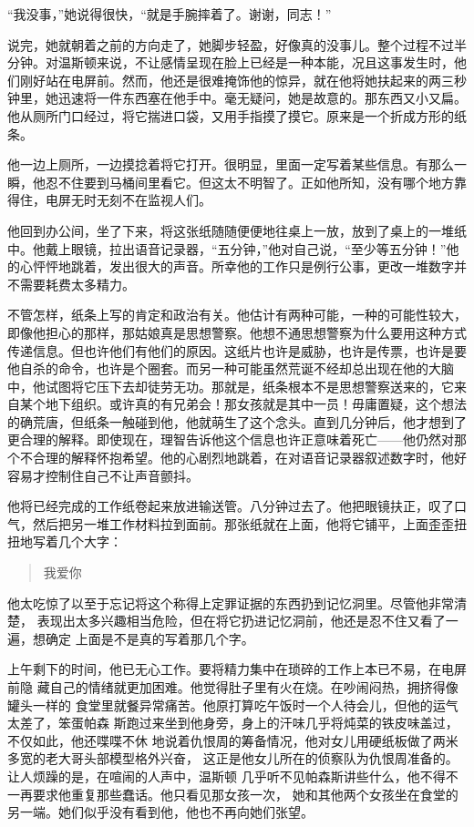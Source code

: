 ``我没事，''她说得很快，``就是手腕摔着了。谢谢，同志！''

说完，她就朝着之前的方向走了，她脚步轻盈，好像真的没事儿。整个过程不过半分钟。对温斯顿来说，不让感情呈现在脸上已经是一种本能，况且这事发生时，他们刚好站在电屏前。然而，他还是很难掩饰他的惊异，就在他将她扶起来的两三秒钟里，她迅速将一件东西塞在他手中。毫无疑问，她是故意的。那东西又小又扁。他从厕所门口经过，将它揣进口袋，又用手指摸了摸它。原来是一个折成方形的纸条。

他一边上厕所，一边摸捻着将它打开。很明显，里面一定写着某些信息。有那么一瞬，他忍不住要到马桶间里看它。但这太不明智了。正如他所知，没有哪个地方靠得住，电屏无时无刻不在监视人们。

他回到办公间，坐了下来，将这张纸随随便便地往桌上一放，放到了桌上的一堆纸中。他戴上眼镜，拉出语音记录器，``五分钟，''他对自己说，``至少等五分钟！''他的心怦怦地跳着，发出很大的声音。所幸他的工作只是例行公事，更改一堆数字并不需要耗费太多精力。

不管怎样，纸条上写的肯定和政治有关。他估计有两种可能，一种的可能性较大，即像他担心的那样，那姑娘真是思想警察。他想不通思想警察为什么要用这种方式传递信息。但也许他们有他们的原因。这纸片也许是威胁，也许是传票，也许是要他自杀的命令，也许是个圈套。而另一种可能虽然荒诞不经却总出现在他的大脑中，他试图将它压下去却徒劳无功。那就是，纸条根本不是思想警察送来的，它来自某个地下组织。或许真的有兄弟会！那女孩就是其中一员！毋庸置疑，这个想法的确荒唐，但纸条一触碰到他，他就萌生了这个念头。直到几分钟后，他才想到了更合理的解释。即使现在，理智告诉他这个信息也许正意味着死亡——他仍然对那个不合理的解释怀抱希望。他的心剧烈地跳着，在对语音记录器叙述数字时，他好容易才控制住自己不让声音颤抖。

他将已经完成的工作纸卷起来放进输送管。八分钟过去了。他把眼镜扶正，叹了口气，然后把另一堆工作材料拉到面前。那张纸就在上面，他将它铺平，上面歪歪扭扭地写着几个大字：

\begin{quotation}
我爱你
\end{quotation}

他太吃惊了以至于忘记将这个称得上定罪证据的东西扔到记忆洞里。尽管他非常清楚，
表现出太多兴趣相当危险，但在将它扔进记忆洞前，他还是忍不住又看了一遍，想确定
上面是不是真的写着那几个字。

上午剩下的时间，他已无心工作。要将精力集中在琐碎的工作上本已不易，在电屏前隐
藏自己的情绪就更加困难。他觉得肚子里有火在烧。在吵闹闷热，拥挤得像罐头一样的
食堂里就餐异常痛苦。他原打算吃午饭时一个人待会儿，但他的运气太差了，笨蛋帕森
斯跑过来坐到他身旁，身上的汗味几乎将炖菜的铁皮味盖过，不仅如此，他还喋喋不休
地说着仇恨周的筹备情况，他对女儿用硬纸板做了两米多宽的老大哥头部模型格外兴奋，
这正是他女儿所在的侦察队为仇恨周准备的。让人烦躁的是，在喧闹的人声中，温斯顿
几乎听不见帕森斯讲些什么，他不得不一再要求他重复那些蠢话。他只看见那女孩一次，
她和其他两个女孩坐在食堂的另一端。她们似乎没有看到他，他也不再向她们张望。

